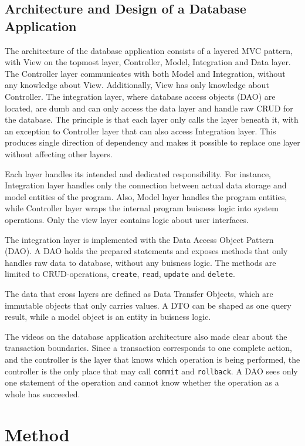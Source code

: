 \documentclass[a4paper]{scrartcl}
\renewcommand{\_}{\textunderscore\allowbreak}
\begin{document}
\subsection{Architecture and Design of a Database Application}

The architecture of the database application consists of a layered MVC pattern, with View on the topmost layer, Controller, Model, Integration and Data layer. The Controller layer communicates with both Model and Integration, without any knowledge about View. Additionally, View has only knowledge about Controller. The integration layer, where database access objects (DAO) are located, are dumb and can only access the data layer and handle raw CRUD for the database. The principle is that each layer only calls the layer beneath it, with an exception to Controller layer that can also access Integration layer. This produces single direction of dependency and makes it possible to replace one layer without affecting other layers.

Each layer handles its intended and dedicated responsibility. For instance, Integration layer handles only the connection between actual data storage and model entities of the program. Also, Model layer handles the program entities, while Controller layer wraps the internal program buisness logic into system operations. Only the view layer contains logic about user interfaces.

The integration layer is implemented with the Data Access Object Pattern (DAO). A DAO holds the prepared statements and exposes methods that only handles raw data to database, without any buisness logic. The methods are limited to CRUD-operations, \texttt{create}, \texttt{read}, \texttt{update} and \texttt{delete}.

The data that cross layers are defined as Data Transfer Objects, which are immutable objects that only carries values. A DTO can be shaped as one query result, while a model object is an entity in buisness logic.

The videos on the database application architecture also made clear about the transaction boundaries. Since a transaction corresponds to one complete action, and the controller  is the layer that knows which operation is being performed, the controller is the only place that may call \texttt{commit} and \texttt{rollback}. A DAO sees only one statement of the operation and cannot know whether the operation as a whole has succeeded.

\section{Method}
\end{document}
